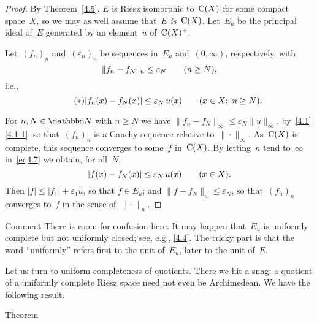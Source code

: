 \documentclass[main.tex]{subfiles}
\begin{document}
\begin{proof}
By Theorem~\ref{4.5},
$E$ is Riesz isomorphic to~$\mathrm{C}(X)$
for some compact space~$X$,
so we may as well assume that~$E$ \emph{is}~$\mathrm{C}(X)$.
Let~$E_u$ be the principal ideal of~$E$
generated by an element~$u$ of~$\mathrm{C}(X)^+$.

Let~$(f_n)_n$ and~$(\varepsilon_n)_n$
be sequences in~$E_u$ and~$(0,\infty)$,
respectively,
with
\begin{equation*}
\| f_n - f_N \|_u \leq \varepsilon_N \qquad (n\geq N)\text{,}
\end{equation*}
i.e.,
\begin{equation*}
\label{eq4.7} \tag{$*$}
|f_n(x)-f_N(x)|\leq \varepsilon_N \,u(x) \qquad (x\in X;\ n\geq N)\text{.}
\end{equation*}

For $n,N\in\N$ with $n\geq N$
we have $\|f_n-f_N\|_\infty \leq \varepsilon_N \|u\|_\infty$,
by~\ref{4.1}\ref{4.1-1};
so that~$(f_n)_n$ is a Cauchy sequence relative to~$\|\cdot\|_\infty$.
As~$\mathrm{C}(X)$ is complete,
this sequence converges to some~$f$ in~$\mathrm{C}(X)$.
By letting~$n$ tend to~$\infty$
in~\eqref{eq4.7} we obtain,
for all~$N$,
\begin{equation*}
|f(x)-f_N(x)|\leq\varepsilon_N\,u(x)\qquad(x\in X)\text{.}
\end{equation*}
Then $|f|\leq |f_1|+\varepsilon_1 u$,
so that $f\in E_u$;
and $\| f - f_N\|_u\leq \varepsilon_N$,
so that~$(f_n)_n$
converges to~$f$ in the sense of~$\|\cdot\|_u$. \xqed
\end{proof}
%
%
\begin{psec}{4.8}{Comment}
There is room for confusion here:
It may happen that~$E_u$ is uniformly complete
but not uniformly closed;
see, e.g., \ref{4.4}.
The tricky part is that the word ``uniformly''
refers first to the unit of~$E_u$,
later to the unit of~$E$.
\end{psec}
%
%
\noindent
Let us turn to uniform completeness of quotients.
There we hit a snag:
a quotient of a uniformly complete Riesz space
need not even be Archimedean.
We have the following result.
\begin{psec}{4.9}{Theorem}
\end{psec}
\end{document}
